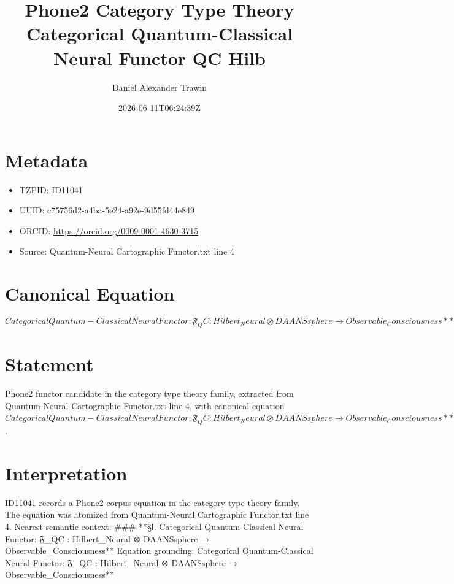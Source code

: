 \documentclass[11pt]{article}
\title{Phone2 Category Type Theory Categorical Quantum-Classical Neural Functor QC Hilb}
\author{Daniel Alexander Trawin}
\date{2026-06-11T06:24:39Z}
\begin{document}
\maketitle
\section*{Metadata}
\begin{itemize}
\item TZPID: ID11041
\item UUID: c75756d2-a4ba-5e24-a92e-9d55fd44e849
\item ORCID: \url{https://orcid.org/0009-0001-4630-3715}
\item Source: Quantum-Neural Cartographic Functor.txt line 4
\end{itemize}
\section*{Canonical Equation}
\[
Categorical Quantum-Classical Neural Functor: 𝔉_QC : Hilbert_Neural ⊗ DAANSsphere → Observable_Consciousness**
\]
\section*{Statement}
Phone2 functor candidate in the category type theory family, extracted from Quantum-Neural Cartographic Functor.txt line 4, with canonical equation $Categorical Quantum-Classical Neural Functor: 𝔉_QC : Hilbert_Neural ⊗ DAANSsphere → Observable_Consciousness**$.
\section*{Interpretation}
ID11041 records a Phone2 corpus equation in the category type theory family. The equation was atomized from Quantum-Neural Cartographic Functor.txt line 4. Nearest semantic context: ### **§Ⅰ. Categorical Quantum-Classical Neural Functor: 𝔉_QC : Hilbert_Neural ⊗ DAANSsphere → Observable_Consciousness** Equation grounding: Categorical Quantum-Classical Neural Functor: 𝔉_QC : Hilbert_Neural ⊗ DAANSsphere → Observable_Consciousness**
\end{document}
